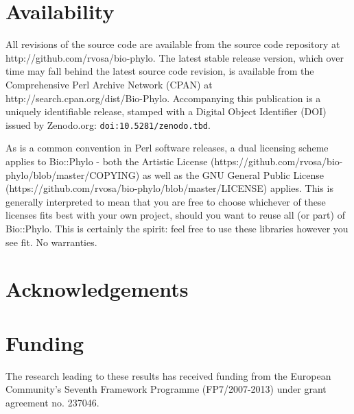 \documentclass{bioinfo}
\begin{document}
\section{Availability}

All revisions of the source code are available from the source code repository at
http://github.com/rvosa/bio-phylo. The latest stable release version, which over time may
fall behind the latest source code revision, is available from the Comprehensive Perl 
Archive Network (CPAN) at http://search.cpan.org/dist/Bio-Phylo. Accompanying this 
publication is a uniquely identifiable release, stamped with a Digital Object Identifier 
(DOI) issued by Zenodo.org: \texttt{doi:10.5281/zenodo.tbd}.

As is a common convention in Perl software releases, a dual licensing scheme applies to
Bio::Phylo - both the Artistic License 
(https://github.com/rvosa/bio-phylo/blob/master/COPYING) as well as the GNU General Public 
License (https://github.com/rvosa/bio-phylo/blob/master/LICENSE) applies. This is 
generally interpreted to mean that you are free to choose whichever of these licenses fits 
best with your own project, should you want to reuse all (or part) of Bio::Phylo. This is 
certainly the spirit: feel free to use these libraries however you see fit. No warranties.

\section*{Acknowledgements}


\section*{Funding}

The research leading to these results has received funding from the European Community's 
Seventh Framework Programme (FP7/2007-2013) under grant agreement no. 237046.




\end{document}

